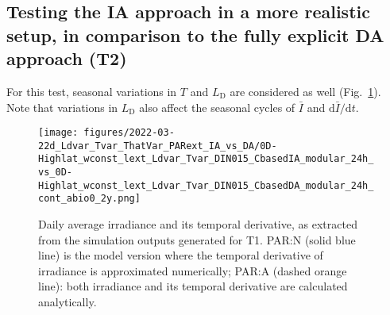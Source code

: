 \documentclass[gmd, manuscript]{copernicus}
\newcommand{\onur}[1]{\textcolor{blue}{\{Onur: #1\}}}
\begin{document}
\FloatBarrier%

\subsection{Testing the IA approach in a more realistic setup, in comparison to the fully explicit DA approach (T2)}

For this test, seasonal variations in $T$ and $L_{\text{D}}$ are considered as well (Fig.~\ref{f.T2env}).  Note that variations in $L_{\text{D}}$ also affect the seasonal cycles of $\bar{I}$ and $\text{d}\bar{I}/\text{d}t$.

\begin{figure}[ht!]
  \texttt{[image: figures/2022-03-22d\_Ldvar\_Tvar\_ThatVar\_PARext\_IA\_vs\_DA/0D-Highlat\_wconst\_lext\_Ldvar\_Tvar\_DIN015\_CbasedIA\_modular\_24h\_vs\_0D-Highlat\_wconst\_lext\_Ldvar\_Tvar\_DIN015\_CbasedDA\_modular\_24h\_cont\_abio0\_2y.png]}
  \caption{Daily average irradiance and its temporal derivative, as extracted from the simulation outputs generated for T1. PAR:N (solid blue line) is the model version where the temporal derivative of irradiance is approximated numerically; PAR:A (dashed orange line): both irradiance and its temporal derivative are calculated analytically.\label{f.T2env}}
\end{figure}


%
\end{document}
